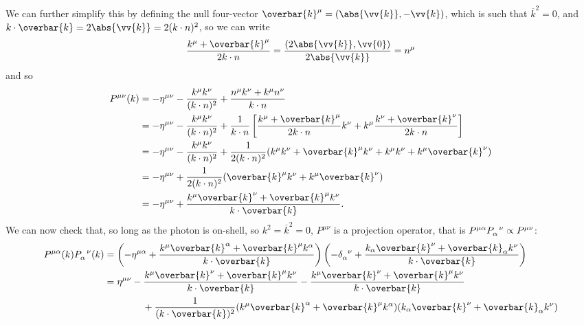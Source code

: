 \documentclass[fleqn]{NotesClass}
\newcommand{\minkowskiMetric}{\eta}
\begin{document}
    We can further simplify this by defining the null four-vector \(\overbar{k}^\mu = (\abs{\vv{k}}, -\vv{k})\), which is such that \(\overbar{k}^2 = 0\), and \(k \cdot \overbar{k} = 2 \abs{\vv{k}} = 2(k \cdot n)^2\), so we can write
    \begin{equation}
        \frac{k^\mu + \overbar{k}^\mu}{2k\cdot n} = \frac{(2\abs{\vv{k}}, \vv{0})}{2\abs{\vv{k}}} = n^\mu
    \end{equation}
    and so
    \begin{align}
        P^{\mu\nu}(k) &= -\minkowskiMetric^{\mu\nu} - \frac{k^\mu k^\nu}{(k \cdot n)^2} + \frac{n^\mu k^\nu + k^\mu n^\nu}{k \cdot n}\\
        &= -\minkowskiMetric^{\mu\nu} - \frac{k^\mu k^\nu}{(k \cdot n)^2} + \frac{1}{k \cdot n} \left[ \frac{k^\mu + \overbar{k}^\mu}{2 k \cdot n}k^\nu + k^\mu \frac{k^\nu + \overbar{k}^\nu}{2k \cdot n} \right]\\
        &= -\minkowskiMetric^{\mu\nu} - \frac{k^\mu k^\nu}{(k \cdot n)^2} + \frac{1}{2(k \cdot n)^2} (k^\mu k^\nu + \overbar{k}^\mu k^\nu + k^\mu k^\nu + k^\mu \overbar{k}^\nu)\notag\\
        &= -\minkowskiMetric^{\mu\nu} + \frac{1}{2(k \cdot n)^2}(\overbar{k}^\mu k^\nu + k^\mu \overbar{k}^\nu)\\
        &= -\minkowskiMetric^{\mu\nu} + \frac{k^\mu \overbar{k}^\nu + \overbar{k}^\mu k^\nu}{k \cdot \overbar{k}}.
    \end{align}
    We can now check that, so long as the photon is on-shell, so \(k^2 = \overbar{k}^2 = 0\), \(P^{\mu\nu}\) is a projection operator, that is \(P^{\mu\alpha}\tensor{P}{_\alpha^\nu} \propto P^{\mu\nu}\):
    \begin{align}
        P^{\mu\alpha}(k) \tensor{P}{_\alpha^\nu}(k) &= \left( -\minkowskiMetric^{\mu\alpha} + \frac{k^\mu\overbar{k}^\alpha + \overbar{k}^\mu k^\alpha}{k \cdot \overbar{k}} \right) \left( -\tensor{\delta}{_\alpha^\nu} + \frac{k_\alpha \overbar{k}^\nu + \overbar{k}_\alpha k^\nu}{k \cdot \overbar{k}} \right)\\
        &= \minkowskiMetric^{\mu\nu} - \frac{k^\mu\overbar{k}^\nu + \overbar{k}^\mu k^\nu}{k \cdot \overbar{k}} - \frac{k^\mu \overbar{k}^\nu + \overbar{k}^\mu k^\nu}{k \cdot \overbar{k}}\\
        &\qquad\qquad + \frac{1}{(k \cdot \overbar{k})^2} (k^\mu \overbar{k}^\alpha + \overbar{k}^\mu k^\alpha)(k_\alpha \overbar{k}^\nu + \overbar{k}_\alpha k^\nu)\\
    \end{align}
\end{document}
